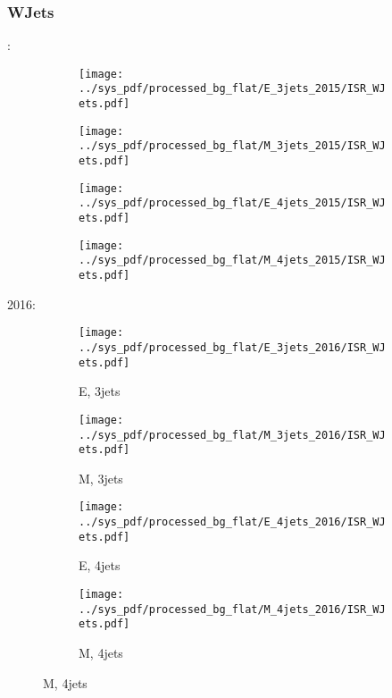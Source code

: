 \documentclass{beamer}
\begin{document}
\begin{frame}
\frametitle{WJets}
\fontsize{5}{1}:
\begin{figure}
\centering
\begin{subfigure}[b]{0.24\textwidth}
\texttt{[image: ../sys\_pdf/processed\_bg\_flat/E\_3jets\_2015/ISR\_WJets.pdf]}
\end{subfigure}
\begin{subfigure}[b]{0.24\textwidth}
\texttt{[image: ../sys\_pdf/processed\_bg\_flat/M\_3jets\_2015/ISR\_WJets.pdf]}
\end{subfigure}
\begin{subfigure}[b]{0.24\textwidth}
\texttt{[image: ../sys\_pdf/processed\_bg\_flat/E\_4jets\_2015/ISR\_WJets.pdf]}
\end{subfigure}
\begin{subfigure}[b]{0.24\textwidth}
\texttt{[image: ../sys\_pdf/processed\_bg\_flat/M\_4jets\_2015/ISR\_WJets.pdf]}
\end{subfigure}
\end{figure}
2016:
\begin{figure}
\centering
\begin{subfigure}[b]{0.24\textwidth}
\texttt{[image: ../sys\_pdf/processed\_bg\_flat/E\_3jets\_2016/ISR\_WJets.pdf]}
\captionsetup{font=tiny}
\caption{E, 3jets}
\end{subfigure}
\begin{subfigure}[b]{0.24\textwidth}
\texttt{[image: ../sys\_pdf/processed\_bg\_flat/M\_3jets\_2016/ISR\_WJets.pdf]}
\captionsetup{font=tiny}
\caption{M, 3jets}
\end{subfigure}
\begin{subfigure}[b]{0.24\textwidth}
\texttt{[image: ../sys\_pdf/processed\_bg\_flat/E\_4jets\_2016/ISR\_WJets.pdf]}
\captionsetup{font=tiny}
\caption{E, 4jets}
\end{subfigure}
\begin{subfigure}[b]{0.24\textwidth}
\texttt{[image: ../sys\_pdf/processed\_bg\_flat/M\_4jets\_2016/ISR\_WJets.pdf]}
\captionsetup{font=tiny}
\caption{M, 4jets}
\end{subfigure}
\end{figure}
\end{frame}
\end{document}

